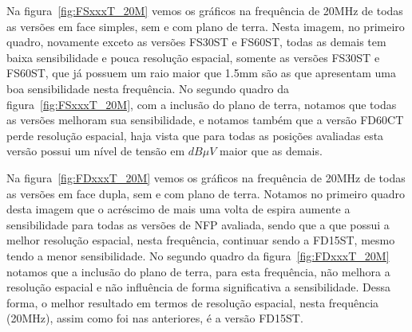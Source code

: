 Na figura~\ref{fig:FSxxxT_20M} vemos os gráficos na frequência de 20MHz de todas as versões em face simples, sem e com plano de terra. Nesta imagem, no primeiro quadro, novamente exceto as versões FS30ST e FS60ST, todas as demais tem baixa sensibilidade e pouca resolução espacial, somente as versões FS30ST e FS60ST, que já possuem um raio maior que 1.5mm são as que apresentam uma boa sensibilidade nesta frequência. No segundo quadro da figura~\ref{fig:FSxxxT_20M}, com a inclusão do plano de terra, notamos que todas as versões melhoram sua sensibilidade, e notamos também que a versão FD60CT perde resolução espacial, haja vista que para todas as posições avaliadas esta versão possui um nível de tensão em $dB \mu V$ maior que as demais. 

Na figura~\ref{fig:FDxxxT_20M} vemos os gráficos na frequência de 20MHz de todas as versões em face dupla, sem e com plano de terra. Notamos no primeiro quadro desta imagem que o acréscimo de mais uma volta de espira aumente a sensibilidade para todas as versões de NFP avaliada, sendo que a que possui a melhor resolução espacial, nesta frequência, continuar sendo a FD15ST, mesmo tendo a menor sensibilidade. No segundo quadro da figura~\ref{fig:FDxxxT_20M} notamos que a inclusão do plano de terra, para esta frequência, não melhora a resolução espacial e não influência de forma significativa a sensibilidade. Dessa forma, o melhor resultado em termos de resolução espacial, nesta frequência (20MHz), assim como foi nas anteriores, é a versão FD15ST.

